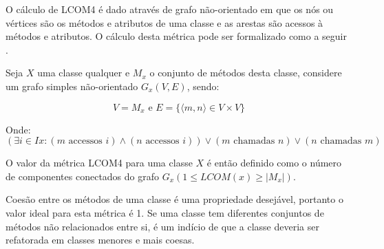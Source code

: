 \begin{itemize}
O cálculo de LCOM4 é dado através de grafo não-orientado em que os nós ou
vértices são os métodos e atributos de uma classe e as arestas são acessos à
métodos e atributos. O cálculo desta métrica pode ser formalizado como a
seguir \cite{Silva2012}.

Seja $ X $ uma classe qualquer e $ M_x $ o conjunto de métodos desta classe,
considere um grafo simples não-orientado $ G_x(V, E) $, sendo:

\begin{equation}
V = M_x
\text{ e }
E = \{ \langle m, n \rangle \in V \times V \}
\end{equation}

Onde:
\begin{equation}
(\exists i \in Ix : (m \text{ accessos } i) \land (n \text{ accessos } i)) \lor (m \text{ chamadas } n) \lor (n \text{ chamadas } m)
\end{equation}

O valor da métrica LCOM4 para uma classe $ X $ é então definido como o número
de componentes conectados do grafo $ G_x (1 \leq LCOM(x) \geq | M_x |)$.

Coesão entre os métodos de uma classe é uma propriedade desejável, portanto o
valor ideal para esta métrica é 1. Se uma classe tem diferentes conjuntos de
métodos não relacionados entre si, é um indício de que a classe deveria ser
refatorada em classes menores e mais coesas.

\end{itemize}
